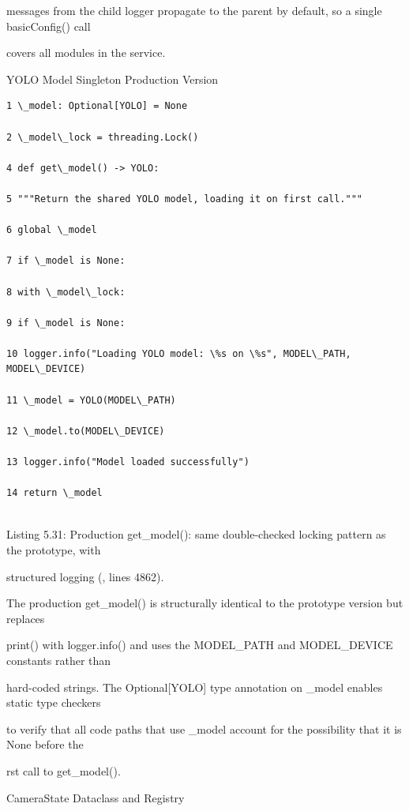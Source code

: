 messages from the child logger propagate to the parent by default, so a single basicConfig() call

covers all modules in the service.

YOLO Model Singleton  Production Version

\begin{listingbox}
	\begin{verbatim}
1 \_model: Optional[YOLO] = None

2 \_model\_lock = threading.Lock()

4 def get\_model() -> YOLO:

5 """Return the shared YOLO model, loading it on first call."""

6 global \_model

7 if \_model is None:

8 with \_model\_lock:

9 if \_model is None:

10 logger.info("Loading YOLO model: \%s on \%s", MODEL\_PATH, MODEL\_DEVICE)

11 \_model = YOLO(MODEL\_PATH)

12 \_model.to(MODEL\_DEVICE)

13 logger.info("Model loaded successfully")

14 return \_model


\end{verbatim}
\end{listingbox}
Listing 5.31: Production get\_model(): same double-checked locking pattern as the prototype, with

structured logging (, lines 4862).

The production get\_model() is structurally identical to the prototype version but replaces

print() with logger.info() and uses the MODEL\_PATH and MODEL\_DEVICE constants rather than

hard-coded strings. The Optional[YOLO] type annotation on \_model enables static type checkers

to verify that all code paths that use \_model account for the possibility that it is None before the

rst call to get\_model().

CameraState Dataclass and Registry

